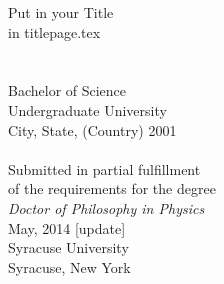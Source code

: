 %
%
%
%

\begin{titlepage}
\begin{center}
\vspace*{0.2cm}
\noindent\makebox[\linewidth]{\rule{\textwidth}{0.3pt}}
{\huge %
Put in your Title\\[-0.3cm]
in titlepage.tex\\[0.4cm]
}
\noindent\makebox[\linewidth]{\rule{\textwidth}{0.3pt}}\\ %
\vspace{0.5cm}
\vspace{0.5cm}
\\[6pt]
Bachelor of Science\\
Undergraduate University\\
City, State, (Country) 2001\\
\vspace{1.3cm}
\\[6pt]
Submitted in partial fulfillment\\
of the requirements for the degree\\
\emph{Doctor of Philosophy in Physics}\\
May, 2014 [update]\\
Syracuse University\\
Syracuse, New York

\end{center}
\end{titlepage}

